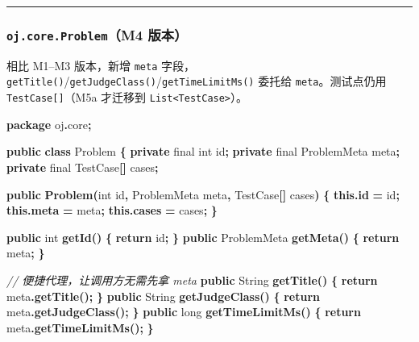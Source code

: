 \documentclass[
  11pt,
]{ctexart}
\newenvironment{Shaded}{\begin{snugshade}}{\end{snugshade}}
\newcommand{\BuiltInTok}[1]{#1}
\newcommand{\CommentTok}[1]{\textcolor[rgb]{0.56,0.35,0.01}{\textit{#1}}}
\newcommand{\ControlFlowTok}[1]{\textcolor[rgb]{0.13,0.29,0.53}{\textbf{#1}}}
\newcommand{\DataTypeTok}[1]{\textcolor[rgb]{0.13,0.29,0.53}{#1}}
\newcommand{\FunctionTok}[1]{\textcolor[rgb]{0.13,0.29,0.53}{\textbf{#1}}}
\newcommand{\ImportTok}[1]{#1}
\newcommand{\KeywordTok}[1]{\textcolor[rgb]{0.13,0.29,0.53}{\textbf{#1}}}
\newcommand{\NormalTok}[1]{#1}
\newcommand{\OperatorTok}[1]{\textcolor[rgb]{0.81,0.36,0.00}{\textbf{#1}}}
\begin{document}
\begin{center}\rule{0.5\linewidth}{0.5pt}\end{center}

\hypertarget{oj.core.problemm4-ux7248ux672c}{%
\subsubsection{\texorpdfstring{\texttt{oj.core.Problem}（M4
版本）}{oj.core.Problem（M4 版本）}}\label{oj.core.problemm4-ux7248ux672c}}

相比 M1--M3 版本，新增 \texttt{meta}
字段，\texttt{getTitle()}/\texttt{getJudgeClass()}/\texttt{getTimeLimitMs()}
委托给 \texttt{meta}。测试点仍用 \texttt{TestCase{[}{]}}（M5a 才迁移到
\texttt{List\textless{}TestCase\textgreater{}}）。

\begin{Shaded}
\begin{Highlighting}[]
\KeywordTok{package}\ImportTok{ oj}\OperatorTok{.}\ImportTok{core}\OperatorTok{;}

\KeywordTok{public} \KeywordTok{class}\NormalTok{ Problem }\OperatorTok{\{}
    \KeywordTok{private} \DataTypeTok{final} \DataTypeTok{int}\NormalTok{ id}\OperatorTok{;}
    \KeywordTok{private} \DataTypeTok{final}\NormalTok{ ProblemMeta meta}\OperatorTok{;}
    \KeywordTok{private} \DataTypeTok{final}\NormalTok{ TestCase}\OperatorTok{[]}\NormalTok{ cases}\OperatorTok{;}

    \KeywordTok{public} \FunctionTok{Problem}\OperatorTok{(}\DataTypeTok{int}\NormalTok{ id}\OperatorTok{,}\NormalTok{ ProblemMeta meta}\OperatorTok{,}\NormalTok{ TestCase}\OperatorTok{[]}\NormalTok{ cases}\OperatorTok{)} \OperatorTok{\{}
        \KeywordTok{this}\OperatorTok{.}\FunctionTok{id} \OperatorTok{=}\NormalTok{ id}\OperatorTok{;}
        \KeywordTok{this}\OperatorTok{.}\FunctionTok{meta} \OperatorTok{=}\NormalTok{ meta}\OperatorTok{;}
        \KeywordTok{this}\OperatorTok{.}\FunctionTok{cases} \OperatorTok{=}\NormalTok{ cases}\OperatorTok{;}
    \OperatorTok{\}}

    \KeywordTok{public} \DataTypeTok{int} \FunctionTok{getId}\OperatorTok{()} \OperatorTok{\{} \ControlFlowTok{return}\NormalTok{ id}\OperatorTok{;} \OperatorTok{\}}
    \KeywordTok{public}\NormalTok{ ProblemMeta }\FunctionTok{getMeta}\OperatorTok{()} \OperatorTok{\{} \ControlFlowTok{return}\NormalTok{ meta}\OperatorTok{;} \OperatorTok{\}}

    \CommentTok{// 便捷代理，让调用方无需先拿 meta}
    \KeywordTok{public} \BuiltInTok{String} \FunctionTok{getTitle}\OperatorTok{()} \OperatorTok{\{} \ControlFlowTok{return}\NormalTok{ meta}\OperatorTok{.}\FunctionTok{getTitle}\OperatorTok{();} \OperatorTok{\}}
    \KeywordTok{public} \BuiltInTok{String} \FunctionTok{getJudgeClass}\OperatorTok{()} \OperatorTok{\{} \ControlFlowTok{return}\NormalTok{ meta}\OperatorTok{.}\FunctionTok{getJudgeClass}\OperatorTok{();} \OperatorTok{\}}
    \KeywordTok{public} \DataTypeTok{long} \FunctionTok{getTimeLimitMs}\OperatorTok{()} \OperatorTok{\{} \ControlFlowTok{return}\NormalTok{ meta}\OperatorTok{.}\FunctionTok{getTimeLimitMs}\OperatorTok{();} \OperatorTok{\}}


\end{Highlighting}
\end{Shaded}
\end{document}

